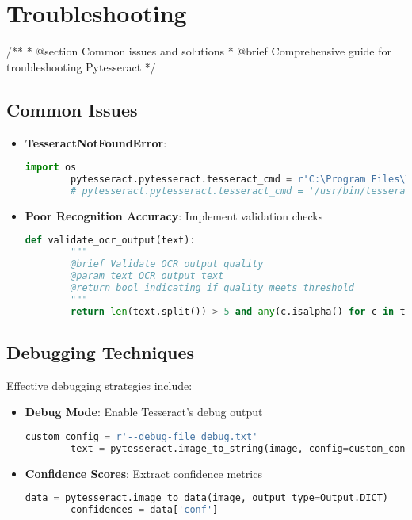 \clearpage

\section{Troubleshooting}

/**
* @section Common issues and solutions
* @brief Comprehensive guide for troubleshooting Pytesseract
*/

\subsection{Common Issues}
\begin{itemize}
	\item \textbf{TesseractNotFoundError}:
	\begin{lstlisting}[language=Python]
		import os
		pytesseract.pytesseract.tesseract_cmd = r'C:\Program Files\Tesseract-OCR\tesseract.exe'  # Windows
		# pytesseract.pytesseract.tesseract_cmd = '/usr/bin/tesseract'  # Linux
	\end{lstlisting}
	
	\item \textbf{Poor Recognition Accuracy}: Implement validation checks
	\begin{lstlisting}[language=Python]
		def validate_ocr_output(text):
		"""
		@brief Validate OCR output quality
		@param text OCR output text
		@return bool indicating if quality meets threshold
		"""
		return len(text.split()) > 5 and any(c.isalpha() for c in text)
	\end{lstlisting}
\end{itemize}

\subsection{Debugging Techniques}
Effective debugging strategies include:

\begin{itemize}
	\item \textbf{Debug Mode}: Enable Tesseract's debug output
	\begin{lstlisting}[language=Python]
		custom_config = r'--debug-file debug.txt'
		text = pytesseract.image_to_string(image, config=custom_config)
	\end{lstlisting}
	
	\item \textbf{Confidence Scores}: Extract confidence metrics
	\begin{lstlisting}[language=Python]
		data = pytesseract.image_to_data(image, output_type=Output.DICT)
		confidences = data['conf']
	\end{lstlisting}
\end{itemize}

